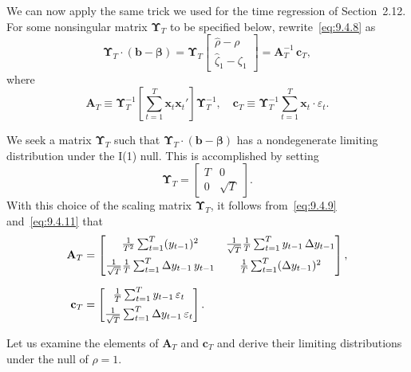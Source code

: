 We can now apply the same trick we used for the time regression of Section~2.12. For some nonsingular matrix $\bm{\Upsilon}_T$ to be specified below, rewrite~\eqref{eq:9.4.8} as
\begin{equation}
\label{eq:9.4.10}
\bm{\Upsilon}_T \cdot (\mathbf{b} - \bm{\beta})
= \bm{\Upsilon}_T \begin{bmatrix} \hat{\rho} - \rho \\ \hat{\zeta}_1 - \zeta_1 \end{bmatrix}
= \mathbf{A}_T^{-1}\, \mathbf{c}_T,
\end{equation}
where
\begin{equation}
\label{eq:9.4.11}
\mathbf{A}_T \equiv \bm{\Upsilon}_T^{-1}\left[\sum_{t=1}^{T} \mathbf{x}_t \mathbf{x}_t'\right]\bm{\Upsilon}_T^{-1}, \quad
\mathbf{c}_T \equiv \bm{\Upsilon}_T^{-1} \sum_{t=1}^{T} \mathbf{x}_t \cdot \varepsilon_t.
\end{equation}

We seek a matrix $\bm{\Upsilon}_T$ such that $\bm{\Upsilon}_T \cdot (\mathbf{b} - \bm{\beta})$ has a nondegenerate limiting distribution under the I(1) null. This is accomplished by setting
\begin{equation}
\label{eq:9.4.12}
\bm{\Upsilon}_T = \begin{bmatrix} T & 0 \\ 0 & \sqrt{T} \end{bmatrix}.
\end{equation}
With this choice of the scaling matrix $\bm{\Upsilon}_T$, it follows from~\eqref{eq:9.4.9} and~\eqref{eq:9.4.11} that
\begin{align}
\mathbf{A}_T &= \begin{bmatrix}
\frac{1}{T^2}\sum_{t=1}^{T}(y_{t-1})^2 &
\frac{1}{\sqrt{T}}\frac{1}{T}\sum_{t=1}^{T} y_{t-1}\,\Delta y_{t-1} \\[6pt]
\frac{1}{\sqrt{T}}\frac{1}{T}\sum_{t=1}^{T}\Delta y_{t-1}\, y_{t-1} &
\frac{1}{T}\sum_{t=1}^{T}(\Delta y_{t-1})^2
\end{bmatrix}, \notag \\[6pt]
\mathbf{c}_T &= \begin{bmatrix}
\frac{1}{T}\sum_{t=1}^{T} y_{t-1}\,\varepsilon_t \\[4pt]
\frac{1}{\sqrt{T}}\sum_{t=1}^{T} \Delta y_{t-1}\,\varepsilon_t
\end{bmatrix}.
\label{eq:9.4.13}
\end{align}

Let us examine the elements of $\mathbf{A}_T$ and $\mathbf{c}_T$ and derive their limiting distributions
under the null of $\rho = 1$.

